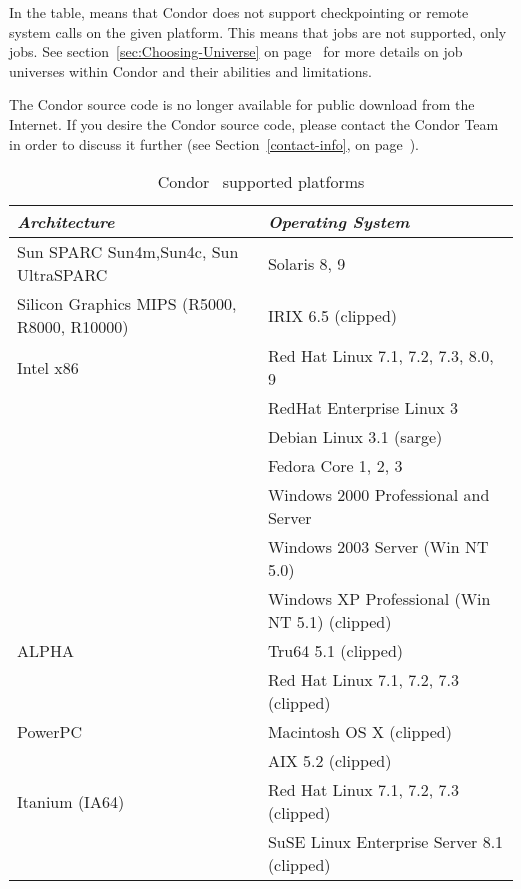 In the table,  means that Condor does not support
checkpointing or remote system calls on the given platform. 
This means that  jobs are not supported, only
 jobs.
See section~\ref{sec:Choosing-Universe} on
page~\pageref{sec:Choosing-Universe} for more details on job universes
within Condor and their abilities and limitations.

The Condor source code is no longer available for public download from the Internet.  If you 
desire the Condor source code, please contact the Condor Team in order to discuss it further 
(see Section~\ref{contact-info}, on page~\pageref{contact-info}).

\begin{center}
\begin{table}[hbt]
\begin{tabular}{|ll|} \hline
\emph{Architecture} & \emph{Operating System} \\ \hline \hline
Sun SPARC Sun4m,Sun4c, Sun UltraSPARC & Solaris 8, 9 \\ \hline
Silicon Graphics MIPS (R5000, R8000, R10000) & IRIX 6.5 (clipped) \\ \hline
Intel x86 & Red Hat Linux 7.1, 7.2, 7.3, 8.0, 9 \\
 & RedHat Enterprise Linux 3 \\
 & Debian Linux 3.1 (sarge) \\
 & Fedora Core 1, 2, 3 \\
 & Windows 2000 Professional and Server \\
 & Windows 2003 Server (Win NT 5.0) \\
 & Windows XP Professional (Win NT 5.1) (clipped) \\ \hline
ALPHA & Tru64 5.1 (clipped) \\
 & Red Hat Linux 7.1, 7.2, 7.3 (clipped) \\ \hline
PowerPC & Macintosh OS X (clipped) \\
 & AIX 5.2 (clipped) \\ \hline
Itanium (IA64) & Red Hat Linux 7.1, 7.2, 7.3 (clipped) \\
& SuSE Linux Enterprise Server 8.1 (clipped) \\ \hline
\end{tabular}
\caption{\label{supported-platforms}Condor \VersionNotice\ supported platforms}
\end{table}
\end{center}


